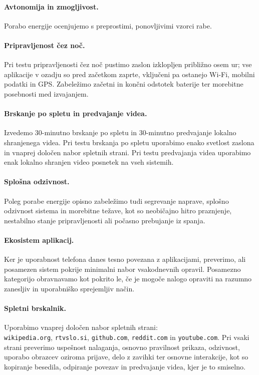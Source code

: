 \documentclass[a4paper,12pt,openright]{book}
\begin{document}
\paragraph{Avtonomija in zmogljivost.}
Porabo energije ocenjujemo s preprostimi, ponovljivimi vzorci rabe.

\paragraph{Pripravljenost čez noč.}
Pri testu pripravljenosti čez noč pustimo zaslon izklopljen približno osem ur; vse aplikacije v ozadju so pred začetkom zaprte, vključeni pa ostanejo Wi-Fi, mobilni podatki in GPS.
Zabeležimo začetni in končni odstotek baterije ter morebitne posebnosti med izvajanjem.

\paragraph{Brskanje po spletu in predvajanje videa.}
Izvedemo 30-minutno brskanje po spletu in 30-minutno predvajanje lokalno shranjenega videa.
Pri testu brskanja po spletu uporabimo enako svetlost zaslona in vnaprej določen nabor spletnih strani.
Pri testu predvajanja videa uporabimo enak lokalno shranjen video posnetek na vseh sistemih.

\paragraph{Splošna odzivnost.}
Poleg porabe energije opisno zabeležimo tudi segrevanje naprave, splošno odzivnost sistema in morebitne težave, kot so neobičajno hitro praznjenje, nestabilno stanje pripravljenosti ali počasno prebujanje iz spanja.

\paragraph{Ekosistem aplikacij.}
Ker je uporabnost telefona danes tesno povezana z aplikacijami, preverimo, ali posamezen sistem pokrije minimalni nabor vsakodnevnih opravil.
Posamezno kategorijo obravnavamo kot pokrito le, če je mogoče nalogo opraviti na razumno zanesljiv in uporabniško sprejemljiv način.

\paragraph{Spletni brskalnik.}
Uporabimo vnaprej določen nabor spletnih strani: \\\texttt{wikipedia.org}, \texttt{rtvslo.si}, \texttt{github.com}, \texttt{reddit.com} in \texttt{youtube.com}.
Pri vsaki strani preverimo uspešnost nalaganja, osnovno pravilnost prikaza, odzivnost, uporabo obrazcev oziroma prijave, delo z zavihki ter osnovne interakcije, kot so kopiranje besedila, odpiranje povezav in predvajanje videa, kjer je to smiselno.
\end{document}
